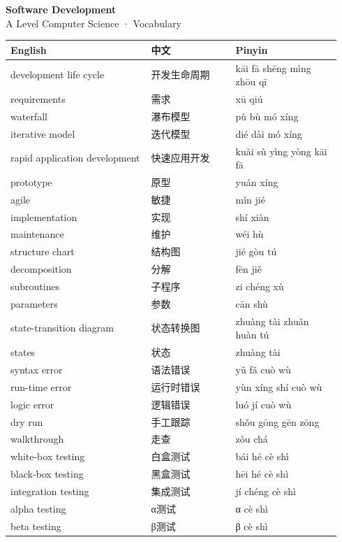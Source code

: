 \documentclass[11pt]{article}
\begin{document}
\begin{center}
  {\LARGE\bfseries Software Development}\\[0.35em]
  {\large A Level Computer Science · Vocabulary}
\end{center}
\vspace{0.6em}

\begin{longtable}{@{}p{0.40\linewidth}p{0.24\linewidth}p{0.30\linewidth}@{}}
\toprule
\textbf{English} & \textbf{中文} & \textbf{Pinyin} \\
\midrule
\endhead
\bottomrule
\endlastfoot
development life cycle & 开发生命周期 & kāi fā shēng mìng zhōu qī \\
requirements & 需求 & xū qiú \\
waterfall & 瀑布模型 & pù bù mó xíng \\
iterative model & 迭代模型 & dié dài mó xíng \\
rapid application development & 快速应用开发 & kuài sù yìng yòng kāi fā \\
prototype & 原型 & yuán xíng \\
agile & 敏捷 & mǐn jié \\
implementation & 实现 & shí xiàn \\
maintenance & 维护 & wéi hù \\
structure chart & 结构图 & jié gòu tú \\
decomposition & 分解 & fēn jiě \\
subroutines & 子程序 & zi chéng xù \\
parameters & 参数 & cān shù \\
state-transition diagram & 状态转换图 & zhuàng tài zhuǎn huàn tú \\
states & 状态 & zhuàng tài \\
syntax error & 语法错误 & yǔ fǎ cuò wù \\
run-time error & 运行时错误 & yùn xíng shí cuò wù \\
logic error & 逻辑错误 & luó jí cuò wù \\
dry run & 手工跟踪 & shǒu gōng gēn zōng \\
walkthrough & 走查 & zǒu chá \\
white-box testing & 白盒测试 & bái hé cè shì \\
black-box testing & 黑盒测试 & hēi hé cè shì \\
integration testing & 集成测试 & jí chéng cè shì \\
alpha testing & α测试 & α cè shì \\
beta testing & β测试 & β cè shì \\

\end{longtable}
\end{document}
